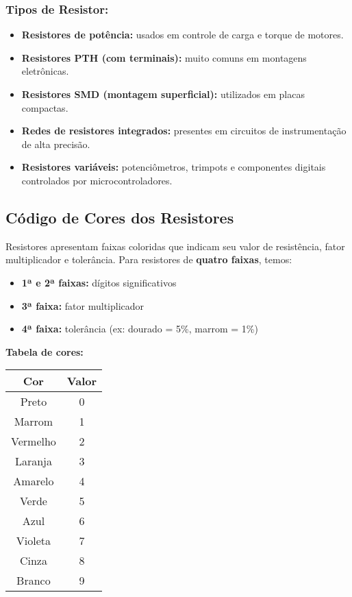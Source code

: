 \subsubsection{Tipos de Resistor:}
\begin{itemize}
    \item \textbf{Resistores de potência:} usados em controle de carga e torque de motores.
    \item \textbf{Resistores PTH (com terminais):} muito comuns em montagens eletrônicas.
    \item \textbf{Resistores SMD (montagem superficial):} utilizados em placas compactas.
    \item \textbf{Redes de resistores integrados:} presentes em circuitos de instrumentação de alta precisão.
    \item \textbf{Resistores variáveis:} potenciômetros, trimpots e componentes digitais controlados por microcontroladores.
\end{itemize}

\subsection{Código de Cores dos Resistores}
Resistores apresentam faixas coloridas que indicam seu valor de resistência, fator multiplicador e tolerância. Para resistores de \textbf{quatro faixas}, temos:

\begin{itemize}
    \item \textbf{1ª e 2ª faixas:} dígitos significativos
    \item \textbf{3ª faixa:} fator multiplicador
    \item \textbf{4ª faixa:} tolerância (ex: dourado = 5\%, marrom = 1\%)
\end{itemize}

\textbf{Tabela de cores:}
\begin{center}
\begin{tabular}{|c|c|}
\hline
\textbf{Cor} & \textbf{Valor} \\
\hline
Preto & 0 \\
Marrom & 1 \\
Vermelho & 2 \\
Laranja & 3 \\
Amarelo & 4 \\
Verde & 5 \\
Azul & 6 \\
Violeta & 7 \\
Cinza & 8 \\
Branco & 9 \\
\hline
\end{tabular}
\end{center}

